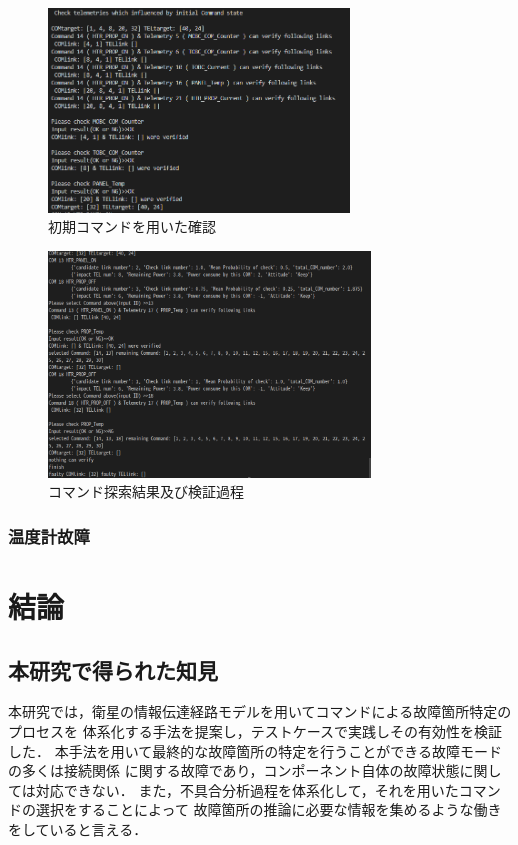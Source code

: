 \documentclass[11pt]{jsarticle}%
\begin{document}
\begin{multicols}{2}
  \begin{figure}[H]
    \centering
      \includegraphics[width=8.0cm]{../figure/COM14_TEL17_initial_COM.png}
      \caption{初期コマンドを用いた確認}
      \label{fig:initial_COM}
  \end{figure}
 \begin{figure}[H]
   \centering
     \includegraphics[height=6.0cm]{../figure/COM14_TEL17_COM_phase.png}
     \caption{コマンド探索結果及び検証過程}
     \label{fig:COM_phase}
 \end{figure}

 \subsubsection{温度計故障}

\section{結論}
\subsection{本研究で得られた知見}%
本研究では，衛星の情報伝達経路モデルを用いてコマンドによる故障箇所特定のプロセスを
体系化する手法を提案し，テストケースで実践しその有効性を検証した．
本手法を用いて最終的な故障箇所の特定を行うことができる故障モードの多くは接続関係
に関する故障であり，コンポーネント自体の故障状態に関しては対応できない．
また，不具合分析過程を体系化して，それを用いたコマンドの選択をすることによって
故障箇所の推論に必要な情報を集めるような働きをしていると言える．


\end{multicols}
\end{document}
